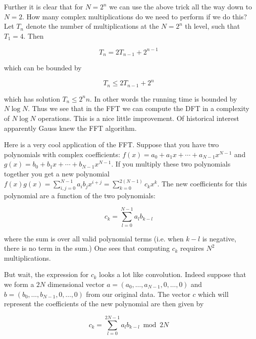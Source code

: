 \documentclass[10pt]{article}
\begin{document}
Further it is clear that for $N=2^{n}$ we can use the above trick all the way down to $N=2$. How many complex multiplications do we need to perform if we do this? Let $T_{n}$ denote the number of multiplications at the $N=2^{n}$ th level, such that $T_{1}=4$. Then


\begin{equation*}
T_{n}=2 T_{n-1}+2^{n-1} \tag{12}
\end{equation*}


which can be bounded by


\begin{equation*}
T_{n} \leq 2 T_{n-1}+2^{n} \tag{13}
\end{equation*}


which has solution $T_{n} \leq 2^{n} n$. In other words the running time is bounded by $N \log N$. Thus we see that in the FFT we can compute the DFT in a complexity of $N \log N$ operations. This is a nice little improvement. Of historical interest apparently Gauss knew the FFT algorithm.

Here is a very cool application of the FFT. Suppose that you have two polynomials with complex coefficients: $f(x)=a_{0}+a_{1} x+\cdots+a_{N-1} x^{N-1}$ and $g(x)=b_{0}+b_{1} x+\cdots+b_{N-1} x^{N-1}$. If you multiply these two polynomials\\
together you get a new polynomial $f(x) g(x)=\sum_{i, j=0}^{N-1} a_{i} b_{j} x^{i+j}=\sum_{k=0}^{2(N-1)} c_{k} x^{k}$. The new coefficients for this polynomial are a function of the two polynomials:


\begin{equation*}
c_{k}=\sum_{l=0}^{N-1} a_{l} b_{k-l} \tag{14}
\end{equation*}


where the sum is over all valid polynomial terms (i.e. when $k-l$ is negative, there is no term in the sum.) One sees that computing $c_{k}$ requires $N^{2}$ multiplications.

But wait, the expression for $c_{k}$ looks a lot like convolution. Indeed suppose that we form a $2 N$ dimensional vector $a=\left(a_{0}, \ldots, a_{N-1}, 0, \ldots, 0\right)$ and $b=\left(b_{0}, \ldots, b_{N-1}, 0, \ldots, 0\right)$ from our original data. The vector $c$ which will represent the coefficients of the new polynomial are then given by


\begin{equation*}
c_{k}=\sum_{l=0}^{2 N-1} a_{l} b_{k-l} \bmod 2 N \tag{15}
\end{equation*}
\end{document}
